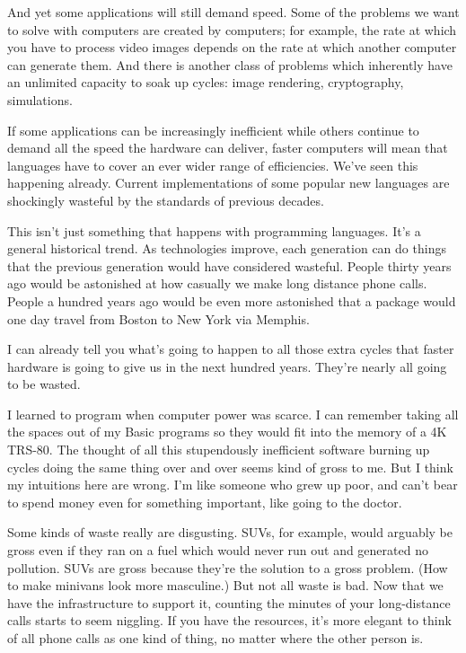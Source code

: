 And yet some applications will still demand speed.
Some of the problems we want to solve with
computers are created by computers; for example, the
rate at which you have to process video images depends
on the rate at which another computer can
generate them.  And there is another class of problems
which inherently have an unlimited capacity to soak up cycles:
image rendering, cryptography, simulations.

If some applications can be increasingly inefficient while
others continue to demand all the speed the hardware can
deliver, faster computers will mean that languages have
to cover an ever wider range of efficiencies.  We've seen
this happening already.  Current implementations of some
popular new languages are shockingly wasteful by the
standards of previous decades.

This isn't just something that happens with programming
languages.  It's a general historical trend.  As technologies improve,
each generation can do things that the previous generation
would have considered wasteful.  People thirty years ago would
be astonished at how casually we make long distance phone calls.
People a hundred years ago would be even more astonished that 
a package would one day travel from Boston to New York via Memphis.



I can already tell you what's going to happen to all those extra
cycles that faster hardware is going to give us in the   
next hundred years.  They're nearly all going to be wasted.

I learned to program when computer power was scarce.
I can remember taking all the spaces out of my Basic programs
so they would fit into the memory of a 4K TRS-80.  The
thought of all this stupendously inefficient software
burning up cycles doing the same thing over and over seems
kind of gross to me.  But I think my intuitions here are wrong.  I'm
like someone who grew up poor, and can't bear to spend money
even for something important, like going to the doctor.

Some kinds of waste really are disgusting.  SUVs, for example, would
arguably be gross even if they ran on a fuel which would never
run out and generated no pollution.  SUVs are gross because they're
the solution to a gross problem. (How to make minivans look more
masculine.)
But not all waste is bad.  Now that we have the infrastructure
to support it, counting the minutes of your long-distance
calls starts to seem niggling.   If you have the
resources, it's more elegant to think of all phone calls as
one kind of thing, no matter where the other person is.

